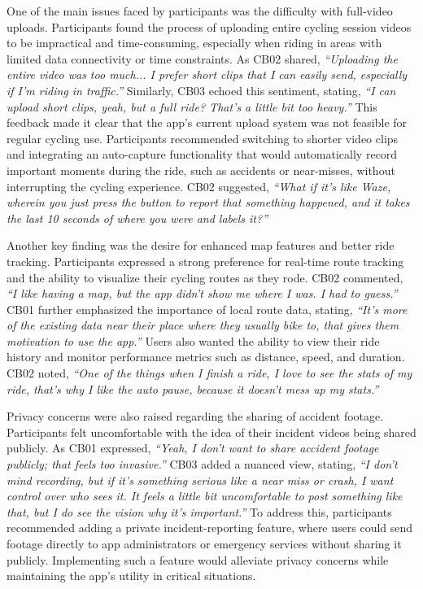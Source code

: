 One of the main issues faced by participants was the difficulty with full-video uploads. Participants found the process of uploading entire cycling session videos to be impractical and time-consuming, especially when riding in areas with limited data connectivity or time constraints. As CB02 shared, \textit{“Uploading the entire video was too much... I prefer short clips that I can easily send, especially if I'm riding in traffic.”} Similarly, CB03 echoed this sentiment, stating, \textit{“I can upload short clips, yeah, but a full ride? That's a little bit too heavy.”} This feedback made it clear that the app's current upload system was not feasible for regular cycling use. Participants recommended switching to shorter video clips and integrating an auto-capture functionality that would automatically record important moments during the ride, such as accidents or near-misses, without interrupting the cycling experience. CB02 suggested, \textit{“What if it's like Waze, wherein you just press the button to report that something happened, and it takes the last 10 seconds of where you were and labels it?”}

Another key finding was the desire for enhanced map features and better ride tracking. Participants expressed a strong preference for real-time route tracking and the ability to visualize their cycling routes as they rode. CB02 commented, \textit{“I like having a map, but the app didn't show me where I was. I had to guess.”} CB01 further emphasized the importance of local route data, stating, \textit{“It's more of the existing data near their place where they usually bike to, that gives them motivation to use the app.”} Users also wanted the ability to view their ride history and monitor performance metrics such as distance, speed, and duration. CB02 noted, \textit{“One of the things when I finish a ride, I love to see the stats of my ride, that's why I like the auto pause, because it doesn't mess up my stats.”}

Privacy concerns were also raised regarding the sharing of accident footage. Participants felt uncomfortable with the idea of their incident videos being shared publicly. As CB01 expressed, \textit{“Yeah, I don't want to share accident footage publicly; that feels too invasive.”} CB03 added a nuanced view, stating, \textit{“I don't mind recording, but if it's something serious like a near miss or crash, I want control over who sees it. It feels a little bit uncomfortable to post something like that, but I do see the vision why it's important.”} To address this, participants recommended adding a private incident-reporting feature, where users could send footage directly to app administrators or emergency services without sharing it publicly. Implementing such a feature would alleviate privacy concerns while maintaining the app's utility in critical situations.


